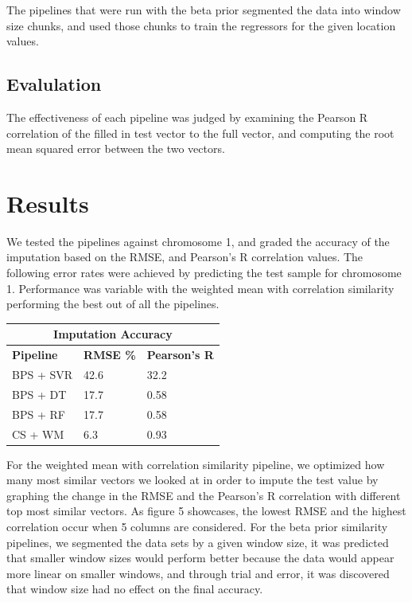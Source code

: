 \documentclass{article} %
\begin{document}
The pipelines that were run with the beta prior segmented the data into window size chunks, and used those chunks to train the regressors for the given location values.

\subsection{Evalulation}
The effectiveness of each pipeline was judged by examining the Pearson R correlation of the filled in test vector to the full vector, and computing the root mean squared error between the two vectors.

\section{Results}
We tested the pipelines against chromosome 1, and graded the accuracy of the imputation based on the RMSE, and Pearson's R correlation values. The following error rates were achieved by predicting the test sample for chromosome 1. Performance was variable with the weighted mean with correlation similarity performing the best out of all the pipelines.
\begin{center}
	\begin{tabular}{ |p{2cm}|p{2.3cm}|p{2.3cm}|}
		\hline
		\multicolumn{3}{|c|}{\textbf{Imputation Accuracy}} \\
		\hline
		\textbf{Pipeline} & \textbf{RMSE \%} & \textbf{Pearson's R} \\
		\hline
		BPS + SVR & 42.6 & 32.2\\
		BPS + DT & 17.7  & 0.58 \\
		BPS + RF & 17.7 & 0.58 \\
		CS + WM & 6.3 & 0.93 \\
		\hline
	\end{tabular}
\end{center}

For the weighted mean with correlation similarity pipeline, we optimized how many most similar vectors we looked at in order to impute the test value by graphing the change in the RMSE and the Pearson's R correlation with different top most similar vectors. As figure 5 showcases, the lowest RMSE and the highest correlation occur when 5 columns are considered. For the beta prior similarity pipelines, we segmented the data sets by a given window size, it was predicted that smaller window sizes would perform better because the data would appear more linear on smaller windows, and through trial and error, it was discovered that window size had no effect on the final accuracy.
\end{document}
